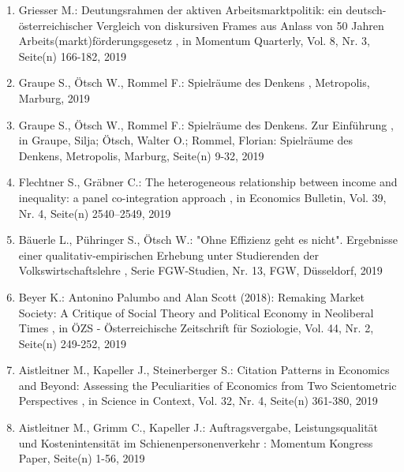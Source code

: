 \begin{enumerate}[leftmargin=*, labelsep=0.5cm]
	 \item Griesser M.:  Deutungsrahmen der aktiven Arbeitsmarktpolitik: ein deutsch-österreichischer Vergleich von diskursiven Frames aus Anlass von 50 Jahren Arbeits(markt)förderungsgesetz  , in Momentum Quarterly, Vol. 8, Nr. 3, Seite(n) 166-182, 2019
	 \item Graupe S., Ötsch W., Rommel F.:  Spielräume des Denkens  , Metropolis, Marburg, 2019
	 \item Graupe S., Ötsch W., Rommel F.:  Spielräume des Denkens. Zur Einführung  , in Graupe, Silja; Ötsch, Walter O.; Rommel, Florian: Spielräume des Denkens, Metropolis, Marburg, Seite(n) 9-32, 2019
	 \item Flechtner S., Gräbner C.:  The heterogeneous relationship between income and inequality: a panel co-integration approach  , in Economics Bulletin, Vol. 39, Nr. 4, Seite(n) 2540–2549, 2019
	 \item Bäuerle L., Pühringer S., Ötsch W.:  "Ohne Effizienz geht es nicht". Ergebnisse einer qualitativ-empirischen Erhebung unter Studierenden der Volkswirtschaftslehre  , Serie FGW-Studien, Nr. 13, FGW, Düsseldorf, 2019
	 \item Beyer K.:  Antonino Palumbo and Alan Scott (2018): Remaking Market Society: A Critique of Social Theory and Political Economy in Neoliberal Times  , in ÖZS - Österreichische Zeitschrift für Soziologie, Vol. 44, Nr. 2, Seite(n) 249-252, 2019
	 \item Aistleitner M., Kapeller J., Steinerberger S.:  Citation Patterns in Economics and Beyond: Assessing the Peculiarities of Economics from Two Scientometric Perspectives  , in Science in Context, Vol. 32, Nr. 4, Seite(n) 361-380, 2019
	 \item Aistleitner M., Grimm C., Kapeller J.:  Auftragsvergabe, Leistungsqualität und Kostenintensität im Schienenpersonenverkehr  : Momentum Kongress Paper, Seite(n) 1-56, 2019
\end{enumerate} 
